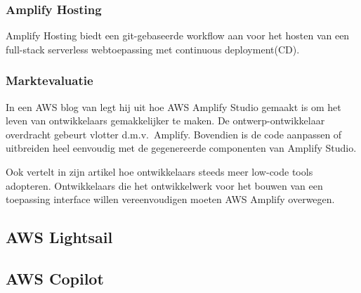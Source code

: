 \subsubsection{Amplify Hosting}


Amplify Hosting biedt een git-gebaseerde workflow aan voor het hosten van een full-stack serverless webtoepassing met continuous deployment(CD).

\subsubsection{Marktevaluatie}



In een AWS blog van \textcite{Spittel2022} legt hij uit hoe AWS Amplify Studio gemaakt is om het leven van ontwikkelaars gemakkelijker te maken.
De ontwerp-ontwikkelaar overdracht gebeurt vlotter d.m.v.\ Amplify.
Bovendien is de code aanpassen of uitbreiden heel eenvoudig met de gegenereerde componenten van Amplify Studio.

Ook \textcite{Nwamba2022} vertelt in zijn artikel hoe ontwikkelaars steeds meer low-code tools adopteren.
Ontwikkelaars die het ontwikkelwerk voor het bouwen van een toepassing interface willen vereenvoudigen moeten AWS Amplify overwegen.




\subsection{AWS Lightsail}
\label{sec:service-lightsail}


\subsection{AWS Copilot}
\label{sec:service-copilot}

